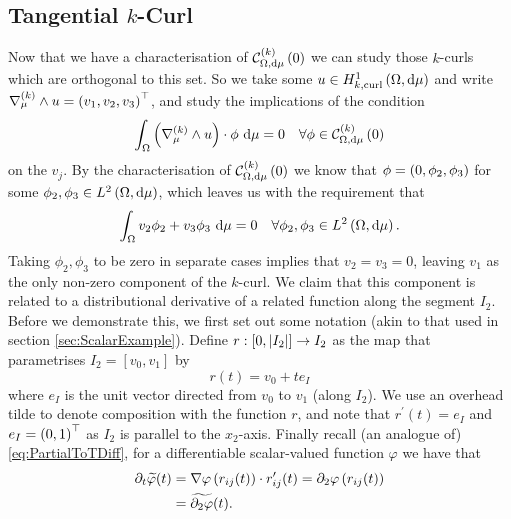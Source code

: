 \subsection{Tangential $k$-Curl} \label{sec:TangKCurl}
Now that we have a characterisation of $\mathcal{C}_{ \Omega, \mathrm{d}\mu}^{(k)}\left( 0 \right)$ we can study those $k$-curls which are orthogonal to this set.
So we take some $u\in H^1_{k,\mathrm{curl}}\left( \Omega, \mathrm{d}\mu \right)$ and write $\nabla_{\mu}^{(k)}\wedge u=\left( v_1,v_2,v_3 \right)^{\top}$, and study the implications of the condition
\begin{align*}
	\int_{\Omega}\left( \nabla_{\mu}^{(k)}\wedge u \right)\cdot\phi \ \mathrm{d}\mu = 0 \quad\forall\phi\in\mathcal{C}_{ \Omega, \mathrm{d}\mu}^{(k)}\left( 0 \right)
\end{align*}
on the $v_j$.
By the characterisation of $\mathcal{C}_{ \Omega, \mathrm{d}\mu}^{(k)}\left( 0 \right)$ we know that $\phi=\left( 0,\phi_2, \phi_3 \right)$ for some $\phi_2,\phi_3\in L^{2}\left( \Omega,\mathrm{d}\mu \right)$, which leaves us with the requirement that
\begin{align*}
	\int_{\Omega}v_2\phi_2 + v_3\phi_3 \ \mathrm{d}\mu = 0 \quad\forall\phi_2,\phi_3\in L^{2}\left( \Omega,\mathrm{d}\mu \right).
\end{align*}
Taking $\phi_2,\phi_3$ to be zero in separate cases implies that $v_2=v_3=0$, leaving $v_1$ as the only non-zero component of the $k$-curl.
We claim that this component is related to a distributional derivative of a related function along the segment $I_2$. 
Before we demonstrate this, we first set out some notation (akin to that used in section \ref{sec:ScalarExample}).
Define $r:[0,\lvert I_2 \rvert]\rightarrow I_2$ as the map that parametrises $I_2=[v_0, v_1]$ by $$r(t) = v_0 + te_I$$ where $e_I$ is the unit vector directed from $v_0$ to $v_1$ (along $I_2$).
We use an overhead tilde to denote composition with the function $r$, and note that $r^{\prime}(t) = e_I$ and $e_I=\left( 0,1 \right)^{\top}$ as $I_2$ is parallel to the $x_2$-axis. 
Finally recall (an analogue of) \eqref{eq:PartialToTDiff}, for a differentiable scalar-valued function $\varphi$ we have that
\begin{align} \label{eq:PartialToTDiff-Vector}
	\partial_t\widetilde{\varphi}(t) &= \nabla\varphi\left( r_{ij}(t) \right)\cdot r'_{ij}(t) = \partial_2\varphi\left( r_{ij}(t) \right) \\
	&= \widetilde{\partial_2\varphi}(t).
\end{align}

